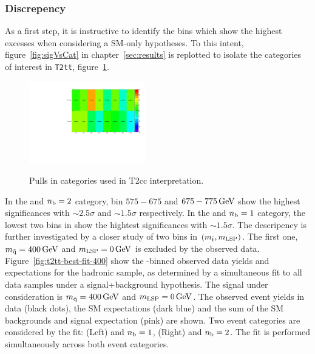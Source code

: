 \subsubsection{Discrepency\label{crap}}
As a first step, it is instructive to identify the \scalht bins which
show the highest excesses when considering a SM-only hypotheses. To this
intent, figure~\ref{fig:sigVsCat} in chapter~\ref{sec:results} is replotted 
to isolate the categories of interest in \texttt{T2tt}, figure~\ref{fig:sigVsCat2}.
\begin{figure}[h!]
  \begin{center}
      \includegraphics[width=0.45\textwidth, trim=0 0 0 30, clip=true]{figures/fit/v22/significances_catVsHt_2}
    \label{fig:sigVsCat2}
    \caption{Pulls in categories used in T2cc interpretation.}
  \end{center}
\end{figure}

In the \njethigh and $n_{\text{b}} = 2$ category, \scalht bin $575-675$ and $675-775\,\text{Ge\hspace{-.08em}V}$ 
show the highest significances with $\sim\!\!2.5\sigma$ and $\sim\!\!1.5\sigma$ respectively.  
In the \njethigh and $n_{\text{b}} = 1$ category, the lowest two \scalht bins in show the 
hightest significances with $\sim\!\!1.5\sigma$. The descripency is further investigated 
by a closer study of two bins in $(m_{\tilde{\rm t}},m_{\text{LSP}})$.  The first one, 
$m_{\tilde{\rm q}} = 400\,\text{Ge\hspace{-.08em}V}$ and $m_{\text{LSP}} = 0\,\text{Ge\hspace{-.08em}V}$ is excluded by the observed data. 
Figure~\ref{fig:t2tt-best-fit-400} show the \scalht-binned observed 
data yields and expectations for the hadronic sample, as determined 
by a simultaneous fit to all data samples under a signal+background 
hypothesis. The signal under consideration is $m_{\tilde{\rm q}} = 400\,\text{Ge\hspace{-.08em}V}$ and 
$m_{\text{LSP}} = 0\,\text{Ge\hspace{-.08em}V}$. The observed event yields in data (black dots), 
the SM expectations (dark blue) and the sum of the SM backgrounds and signal 
expectation (pink) are shown. Two event categories are considered
by the fit: (Left) \njethigh and $n_{\text{b}} = 1$, (Right) \njethigh and 
$n_{\text{b}} = 2$. The fit is performed simultaneously across both event 
categories. 



